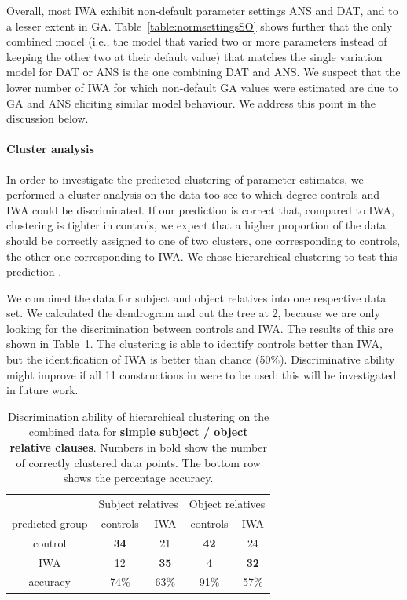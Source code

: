 \documentclass[10pt,letterpaper]{article}
\begin{document}
Overall, most IWA exhibit non-default parameter settings ANS and DAT, and to a lesser extent in GA. Table~\ref{table:normsettingsSO} shows further that the only combined model (i.e., the model that varied two or more parameters instead of keeping the other two at their default value) that matches the single variation model for DAT or ANS is the one combining DAT and ANS. We suspect that the lower number of IWA for which non-default GA values were estimated are due to GA and ANS eliciting similar model behaviour.
We address this point in the discussion below.

\paragraph{Cluster analysis} In order to investigate the
 predicted clustering of parameter estimates, we performed a cluster analysis on the data too see to which degree controls and IWA could be discriminated.
If our prediction is correct that, compared to IWA, clustering is tighter in controls, we expect that a higher proportion of the data should be correctly assigned to one of two clusters, one corresponding to controls, the other one corresponding to IWA. We chose hierarchical clustering to test this prediction \cite{friedman2001elements}.

We combined the data for subject and object relatives into one respective data set.
We calculated the dendrogram and cut the tree at 2, because we are only looking for the discrimination between controls and IWA. The results of this are shown in Table~\ref{table:hclustSO}. The clustering is able to identify controls better than IWA, but the identification of IWA is better than chance (50\%). 
Discriminative ability might improve if all 11 constructions in  were to be used; this will be investigated in future work.

\begin{table}
\begin{tabular}{ccccc}
 &\multicolumn{2}{c}{Subject relatives} & \multicolumn{2}{c}{Object relatives}\\
predicted group &    controls &  IWA & controls & IWA \\ 
         control      &  \textbf{34}             & 21   &        \textbf{42}   & 24\\
         IWA           & 12              & \textbf{35}    &         4    & \textbf{32}\\ 
 \hline        
         accuracy & 74\% & 63\% & 91\% & 57\%
\end{tabular}
\caption{Discrimination ability of hierarchical clustering on the combined data for \textbf{simple subject / object relative clauses}. Numbers in bold show the number of correctly clustered data points. The bottom row shows the percentage accuracy.}
  \label{table:hclustSO}
\end{table}
\end{document}
